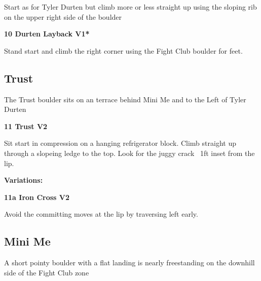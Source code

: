 \begin{multicols}{2}
					\begin{adjustwidth}{0.5cm}{}				
					Start as for Tyler Durten but climb more or less straight up using the sloping rib on the upper right side of the boulder
					\end{adjustwidth}
					\label{rt:Durten Layback}
\colorbox{green!20}{
\parbox{0.95\linewidth}{
\textbf{
10 Durten Layback V1*  
}
}
}

					\begin{adjustwidth}{0.5cm}{}				
					Stand start and climb the right corner using the Fight Club boulder for feet.
					\end{adjustwidth}
			\subsection*{Trust}\label{bf:Trust}
			The Trust boulder sits on an terrace behind Mini Me and to the Left of Tyler Durten\\
			

					\label{rt:Trust}
\colorbox{green!20}{
\parbox{0.95\linewidth}{
\textbf{
11 Trust V2     
}
}
}

					\begin{adjustwidth}{0.5cm}{}				
					Sit start in compression on a hanging refrigerator block. Climb straight up through a slopeing ledge to the top. Look for the juggy crack ~1ft inset from the lip.
					\end{adjustwidth}
						\begin{adjustwidth}{0.5cm}{}				
						\textbf{Variations:} \newline
							\label{vr:Iron Cross}
\colorbox{green!20}{
\parbox{0.95\linewidth}{
\textbf{
11a Iron Cross V2   
}
}
}

							\begin{adjustwidth}{0.5cm}{}				
							Avoid the committing moves at the lip by traversing left early.
							\end{adjustwidth}
						\end{adjustwidth}
			\subsection*{Mini Me}\label{bf:Mini Me}
			A short pointy boulder with a flat landing is nearly freestanding on the downhill side of the Fight Club zone\\
			

\end{multicols}
